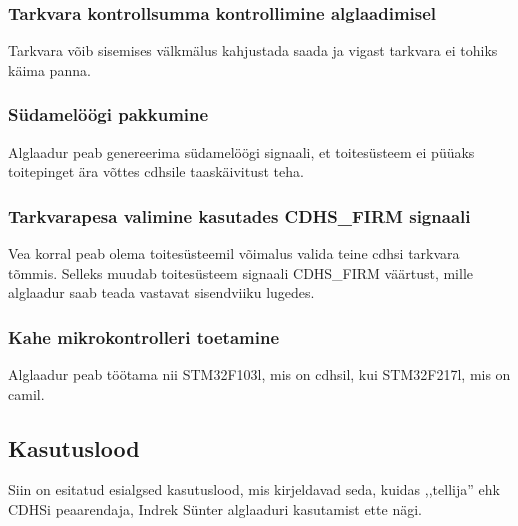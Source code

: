 \documentclass[12pt,a4paper]{article}
\begin{document}
\subsubsection{Tarkvara kontrollsumma kontrollimine alglaadimisel}
Tarkvara võib sisemises välkmälus kahjustada saada ja vigast tarkvara ei tohiks
käima panna.

\subsubsection{Südamelöögi pakkumine}
Alglaadur peab genereerima südamelöögi signaali, et toitesüsteem ei püüaks
toitepinget ära võttes \gls{cdhs}ile taaskäivitust teha.

\subsubsection{Tarkvarapesa valimine kasutades CDHS\_FIRM signaali}
Vea korral peab olema toitesüsteemil võimalus valida teine \gls{cdhs}i tarkvara
tõmmis.  Selleks muudab toitesüsteem signaali CDHS\_FIRM väärtust, mille
alglaadur saab teada vastavat sisendviiku lugedes.

\subsubsection{Kahe mikrokontrolleri toetamine}
Alglaadur peab töötama nii STM32F103l, mis on \gls{cdhs}il, kui STM32F217l, mis
on \gls{cam}il.

\subsection{Kasutuslood}
Siin on esitatud esialgsed kasutuslood, mis kirjeldavad seda, kuidas ,,tellija''
ehk CDHSi peaarendaja, Indrek Sünter alglaaduri kasutamist ette nägi.
\end{document}
